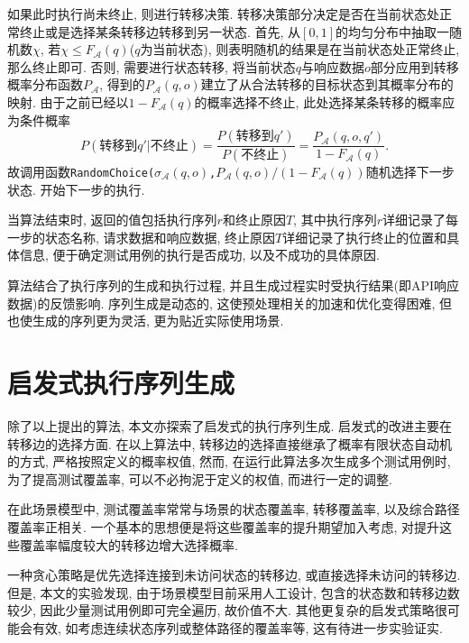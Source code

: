         如果此时执行尚未终止, 则进行转移决策. 转移决策部分决定是否在当前状态处正常终止或是选择某条转移边转移到另一状态. 首先, 从$[0,1]$的均匀分布中抽取一随机数$\chi$, 若$\chi \le F_{\mathcal{A}}(q)$($q$为当前状态), 则表明随机的结果是在当前状态处正常终止, 那么终止即可. 否则, 需要进行状态转移, 将当前状态$q$与响应数据$o$部分应用到转移概率分布函数$P_{\mathcal{A}}$, 得到的$P_{\mathcal{A}}(q,o)$建立了从合法转移的目标状态到其概率分布的映射. 由于之前已经以$1 - F_{\mathcal{A}}(q)$的概率选择不终止, 此处选择某条转移的概率应为条件概率
        \begin{equation}
            P(\text{转移到}q' | \text{不终止}) = \dfrac{P(\text{转移到}q')} {P(\text{不终止})} = \dfrac{P_{\mathcal{A}}(q,o,q')} {1 - F_{\mathcal{A}}(q)}.
        \end{equation}
        故调用函数\texttt{RandomChoice(}$\sigma_{\mathcal{A}}(q,o)$\texttt{,}$P_{\mathcal{A}}(q,o)/\left(1-F_{\mathcal{A}}(q)\right)$随机选择下一步状态. 开始下一步的执行.
        
        当算法结束时, 返回的值包括执行序列$r$和终止原因$T$, 其中执行序列$r$详细记录了每一步的状态名称, 请求数据和响应数据, 终止原因$T$详细记录了执行终止的位置和具体信息, 便于确定测试用例的执行是否成功, 以及不成功的具体原因.
        
        算法结合了执行序列的生成和执行过程, 并且生成过程实时受执行结果(即API响应数据)的反馈影响. 序列生成是动态的, 这使预处理相关的加速和优化变得困难, 但也使生成的序列更为灵活, 更为贴近实际使用场景.
        
    \section{启发式执行序列生成}
        除了以上提出的算法, 本文亦探索了启发式的执行序列生成. 启发式的改进主要在转移边的选择方面. 在以上算法中, 转移边的选择直接继承了概率有限状态自动机的方式, 严格按照定义的概率权值, 然而, 在运行此算法多次生成多个测试用例时, 为了提高测试覆盖率, 可以不必拘泥于定义的权值, 而进行一定的调整.
        
        在此场景模型中, 测试覆盖率常常与场景的状态覆盖率, 转移覆盖率, 以及综合路径覆盖率正相关. 一个基本的思想便是将这些覆盖率的提升期望加入考虑, 对提升这些覆盖率幅度较大的转移边增大选择概率.
        
        一种贪心策略是优先选择连接到未访问状态的转移边, 或直接选择未访问的转移边. 但是, 本文的实验发现, 由于场景模型目前采用人工设计, 包含的状态数和转移边数较少, 因此少量测试用例即可完全遍历, 故价值不大. 其他更复杂的启发式策略很可能会有效, 如考虑连续状态序列或整体路径的覆盖率等, 这有待进一步实验证实.
        
